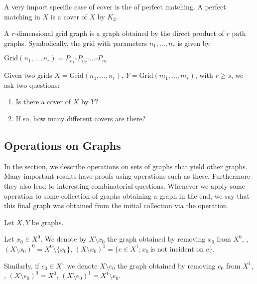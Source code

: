 \begin{definition}
	A very import specific case of cover is the of perfect matching. A perfect matching in $X$ is a cover of $X$ by $K_2$.
\end{definition}

\begin{definition}
	A $r$-dimensional grid graph is a graph obtained by the direct product of $r$ path graphs. Symbolically, the grid with parameters $n_1, ..., n_r$ is given by:
	
	\begin{center}
		$\text{Grid}(n_1, ..., n_r) = P_{n_1}\square P_{n_2} \square... \square P_{n_r}$
	\end{center}
	
\end{definition}

\begin{problem}
	Given two grids $X = \text{Grid}(n_1, ..., n_r)$, $Y = \text{Grid}(m_1, ..., m_s)$, with $r \geq s$, we ask two questions:
	
	\begin{enumerate}
		\item Is there a cover of $X$ by $Y$?
		
		\item If so, how many different covers are there?
	\end{enumerate}	
\end{problem}

\subsection{Operations on Graphs}

In the section, we describe operations on sets of graphs that yield other graphs. Many important results have proofs using operations such as these. Furthermore they also lead to interesting combinatorial questions. Whenever we apply some operation to some collection of graphs obtaining a graph in the end, we say that this final graph was obtained from the initial collection via the operation.

Let $X, Y$ be graphs. 

\begin{definition}
	Let $x_0 \in X^0$. We denote by $X \setminus x_0$ the graph obtained by removing $x_0$ from $X^0$, \ie, $(X \setminus x_0)^0 = X^0 \setminus \{x_0\}$, $(X \setminus x_0)^1 = \{e \in X^1; x_0 \ \text{is not incident on e} \}$.
	
	Similarly, if $e_0 \in X^1$ we denote $X \setminus e_0$ the graph obtained by removing $e_0$ from $X^1$, \ie, $(X \setminus e_0)^0 = X^0$, $(X \setminus e_0)^1 = X^1 \setminus e_0$.
\end{definition}

